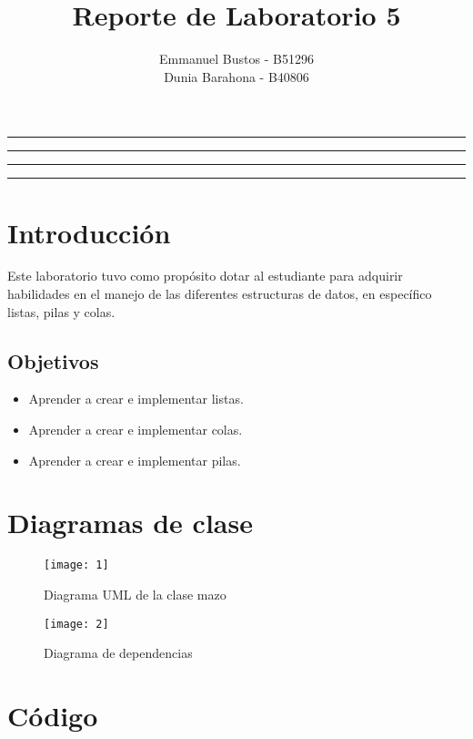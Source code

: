 \documentclass[11pt]{article}
\title{Reporte de Laboratorio 5}
\author{Emmanuel Bustos - B51296 \\ Dunia Barahona - B40806}
\begin{document}
\maketitle
\hrule
\hrule
\tableofcontents
\hspace{5mm}
\hrule
\hrule


\section{Introducción}
Este laboratorio tuvo como propósito dotar al estudiante para adquirir habilidades en el manejo de las diferentes estructuras de datos, en específico listas, pilas y colas.
\subsection{Objetivos}
\begin{itemize}
	\item Aprender a crear e implementar listas.
	\item Aprender a crear e implementar colas.
	\item Aprender a crear e implementar pilas.
\end{itemize}

\section{Diagramas de clase}

\begin{figure}[!ht]
	\caption{Diagrama UML de la clase mazo}
	\centering
	\texttt{[image: 1]}
\end{figure}

\begin{figure}[!ht]
	\caption{Diagrama de dependencias}
	\centering
	\texttt{[image: 2]}
\end{figure}

\newpage

\section{Código}
\end{document}
